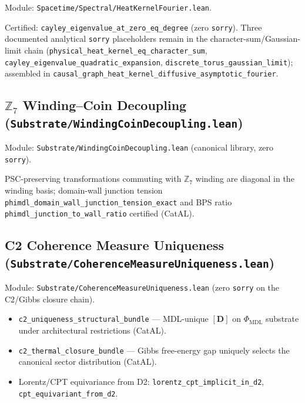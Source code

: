 \documentclass[11pt,a4paper]{article}
\newenvironment{keybox}[1]{%
  \Needspace*{8\baselineskip}%
  \begin{tcolorbox}[
    enhanced,
    breakable=false,
    colback=blue!5,
    colframe=blue!45!black,
    coltitle=black,
    colbacktitle=blue!14,
    boxrule=0.85pt,
    arc=2.5pt,
    left=9pt, right=9pt, top=6pt, bottom=6pt,
    titlerule=0.55pt,
    fonttitle=\bfseries,
    title={#1},
    before upper=\raggedright,
    before skip=0.9\baselineskip,
    after skip=0.9\baselineskip
  ]%
}{%
  \end{tcolorbox}%
}
\theoremstyle{definition}
\begin{document}
Module: \texttt{Spacetime/Spectral/HeatKernelFourier.lean}.

Certified: \lstinline|cayley_eigenvalue_at_zero_eq_degree| (zero \lstinline|sorry|).
Three documented analytical \lstinline|sorry| placeholders remain in the
character-sum/Gaussian-limit chain
(\lstinline|physical_heat_kernel_eq_character_sum|,
\lstinline|cayley_eigenvalue_quadratic_expansion|,
\lstinline|discrete_torus_gaussian_limit|); assembled in
\lstinline|causal_graph_heat_kernel_diffusive_asymptotic_fourier|.

\subsection{$\mathbb{Z}_7$ Winding--Coin Decoupling
  (\texttt{Substrate/\allowbreak WindingCoinDecoupling.lean})}\label{subsec:winding-coin}

Module: \texttt{Substrate/WindingCoinDecoupling.lean} (canonical library, zero \lstinline|sorry|).

\begin{keybox}{\lstinline|diagonal_coin_decouples_sectors| (zero \texttt{sorry})}
PSC-preserving transformations commuting with $\mathbb{Z}_7$ winding are
diagonal in the winding basis; domain-wall junction tension
\lstinline|phimdl_domain_wall_junction_tension_exact| and BPS ratio
\lstinline|phimdl_junction_to_wall_ratio| certified (CatAL).
\end{keybox}

\subsection{C2 Coherence Measure Uniqueness
  (\texttt{Substrate/\allowbreak CoherenceMeasureUniqueness.lean})}\label{subsec:c2-coherence-uniqueness}

Module: \texttt{Substrate/CoherenceMeasureUniqueness.lean} (zero \lstinline|sorry|
on the C2/Gibbs closure chain).

\begin{itemize}[nosep]
\item \lstinline|c2_uniqueness_structural_bundle| --- MDL-unique $[\mathbf{D}]$ on
  $\Phi_{\mathrm{MDL}}$ substrate under architectural restrictions (CatAL).
\item \lstinline|c2_thermal_closure_bundle| --- Gibbs free-energy gap uniquely
  selects the canonical sector distribution (CatAL).
\item Lorentz/CPT equivariance from D2:
  \lstinline|lorentz_cpt_implicit_in_d2|, \lstinline|cpt_equivariant_from_d2|.
\end{itemize}
\end{document}
